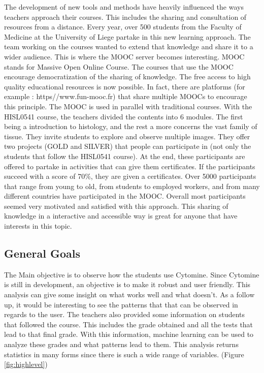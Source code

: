 \documentclass[a4paper,11pt]{report}
\numberwithin{figure}{section} %
\begin{document}
    The development of new tools and methods have heavily influenced the ways teachers approach their courses.
    This includes the sharing and consultation of resources from a distance.
    Every year, over 500 students from the Faculty of Medicine at the University of Liege partake in this new learning approach.
    The team working on the courses wanted to extend that knowledge and share it to a wider audience.
    This is where the MOOC server becomes interesting.
    MOOC stands for Massive Open Online Course.
    The courses that use the MOOC encourage democratization of the sharing of knowledge.
    The free access to high quality educational resources is now possible.
    In fact, there are platforms (for example : https//www.fun-mooc.fr) that share multiple MOOCs to encourage this principle.
    The MOOC is used in parallel with traditional courses.
    With the HISL0541 course, the teachers divided the contents into 6 modules.
    The first being a introduction to histology, and the rest a more concerns the vast family of tissue.
    They invite students to explore and observe multiple images.
    They offer two projects (GOLD and SILVER) that people can participate in (not only the students that follow the HISL0541 course).
    At the end, these participants are offered to partake in activities that can give them certificates.
    If the participants succeed with a score of 70\%, they are given a certificates.
    Over 5000 participants that range from young to old, from students to employed workers, and from many different countries have participated in the MOOC.
    Overall most participants seemed very motivated and satisfied with this approach.
    This sharing of knowledge in a interactive and accessible way is great for anyone that have interests in this topic.


\subsection{General Goals}


    The Main objective is to observe how the students use Cytomine.
    Since Cytomine is still in development, an objective is to make it robust and user friendly.
    This analysis can give some insight on what works well and what doesn't.
    As a follow up, it would be interesting to see the patterns that that can be observed in regards to the user.
    The teachers also provided some information on students that followed the course.
    This includes the grade obtained and all the tests that lead to that final grade.
    With this information, machine learning can be used to analyze these grades and what patterns lead to them.
    This analysis returns statistics in many forms since there is such a wide range of variables. (Figure \ref{fig:highlevel})
\end{document}
